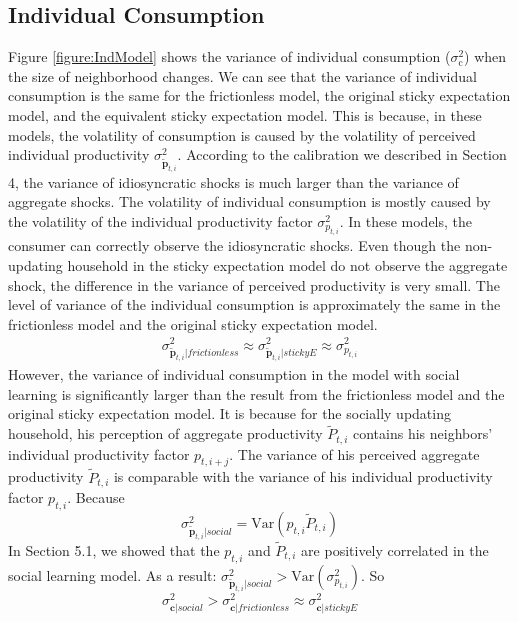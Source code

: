 \documentclass[12pt,letterpaper]{article}
\begin{document}
\subsection{Individual Consumption}
Figure \ref{figure:IndModel} shows the variance of individual consumption ($\sigma^2_{\pmb{\mathrm{c}}}$) when the size of neighborhood changes. We can see that the variance of individual consumption is the same for the frictionless model, the original sticky expectation model, and the equivalent sticky expectation model. This is because, in these models, the volatility of consumption is caused by the volatility of perceived individual productivity $\sigma^{2}_{\tilde{\pmb{p}}_{t,i}}$. According to the calibration we described in Section 4, the variance of idiosyncratic shocks is much larger than the variance of aggregate shocks. The volatility of individual consumption is mostly caused by the volatility of the individual productivity factor $\sigma^2_{p_{t,i}}$. In these models, the consumer can correctly observe the idiosyncratic shocks. Even though the non-updating household in the sticky expectation model do not observe the aggregate shock, the difference in the variance of perceived productivity is very small. The level of variance of the individual consumption is approximately the same in the frictionless model and the original sticky expectation model.
\begin{eqnarray} \label{Result:Ind1}
\sigma^{2}_{\tilde{\pmb{p}}_{t,i}|frictionless}\approx\sigma^{2}_{\tilde{\pmb{p}}_{t,i}|stickyE}\approx\sigma^2_{p_{t,i}}
\end{eqnarray}
However, the variance of individual consumption in the model with social learning is significantly larger than the result from the frictionless model and the original sticky expectation model. It is because for the socially updating household, his perception of aggregate productivity $\tilde{P}_{t,i}$ contains his neighbors' individual productivity factor $p_{t,i+j}$. The variance of his perceived aggregate productivity $\tilde{P}_{t,i}$ is comparable with the variance of his individual productivity factor $p_{t,i}$. Because
\begin{equation*}
\sigma^{2}_{\tilde{\pmb{p}}_{t,i}|social}=\text{Var}(p_{t,i}\tilde{P}_{t,i})
\end{equation*}
In Section 5.1, we showed that the $p_{t,i}$ and $\tilde{P}_{t,i}$ are positively correlated in the social learning model. As a result: $\sigma^{2}_{\tilde{\pmb{p}}_{t,i}|social}>\text{Var}(\sigma^2_{p_{t,i}})$. So
\begin{equation}\label{Result:Ind2}
\sigma^{2}_{\pmb{c}|social}>\sigma^{2}_{\pmb{c}|frictionless}\approx\sigma^{2}_{\pmb{c}|stickyE}
\end{equation}
\end{document}
